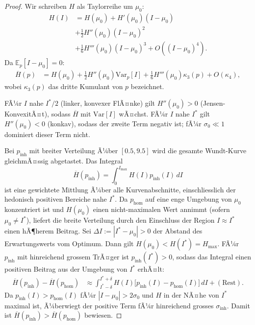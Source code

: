 ﻿\documentclass[12pt,a4paper]{article}
\theoremstyle{definition}
\newcommand{\E}{\mathbb{E}}
\newcommand{\Var}{\mathrm{Var}}
\newcommand{\MHI}{\overline{H}}
\begin{document}
\begin{proof}
Wir schreiben $H$ als Taylorreihe um $\mu_0$:
\begin{align*}
  H(I) &= H(\mu_0) + H'(\mu_0)(I - \mu_0) \\ &+ \tfrac{1}{2}H''(\mu_0)(I-\mu_0)^2 \\
          &+ \tfrac{1}{6}H'''(\mu_0)(I-\mu_0)^3 + O((I-\mu_0)^4).
\end{align*}
Da $\E_{p}[I - \mu_0] = 0$:
\begin{align}
  \MHI(p) &= H(\mu_0) + \tfrac{1}{2}H''(\mu_0)\Var_p[I]
             + \tfrac{1}{6}H'''(\mu_0)\kappa_3(p) + O(\kappa_4),
  \label{eq:mhi_taylor}
\end{align}
wobei $\kappa_3(p)$ das dritte Kumulant von $p$ bezeichnet.

FÃ¼r $I$ nahe $I^*/2$ (linker, konvexer FlÃ¤nke) gilt $H''(\mu_0) > 0$
(Jensen-KonvexitÃ¤t), sodass $\MHI$ mit $\Var[I]$ wÃ¤chst.
FÃ¼r $I$ nahe $I^*$ gilt $H''(\mu_0) < 0$ (konkav), sodass der zweite
Term negativ ist; fÃ¼r $\sigma_0 \ll 1$ dominiert dieser Term nicht.

Bei $p_{\mathrm{inh}}$ mit breiter Verteilung Ã¼ber $[0.5, 9.5]$ wird
die gesamte Wundt-Kurve gleichmÃ¤ssig abgetastet. Das Integral
\[
  \MHI(p_{\mathrm{inh}}) = \int_0^{I_{\max}} H(I) p_{\mathrm{inh}}(I)\, dI
\]
ist eine gewichtete Mittlung Ã¼ber alle Kurvenabschnitte, einschliesslich
der hedonisch positiven Bereiche nahe $I^*$. Da $p_{\mathrm{hom}}$
auf eine enge Umgebung von $\mu_0$ konzentriert ist und $H(\mu_0)$ einen
nicht-maximalen Wert annimmt (sofern $\mu_0 \neq I^*$), liefert die
breite Verteilung durch den Einschluss der Region $I \approx I^*$ einen
hÃ¶herem Beitrag. Sei $\Delta I := |I^* - \mu_0| > 0$ der Abstand des
Erwartungswerts vom Optimum. Dann gilt $H(\mu_0) < H(I^*) = H_{\max}$.
FÃ¼r $p_{\mathrm{inh}}$ mit hinreichend grossem TrÃ¤ger ist
$p_{\mathrm{inh}}(I^*) > 0$, sodass das Integral einen positiven Beitrag
aus der Umgebung von $I^*$ erhÃ¤lt:
\begin{align*}
  \MHI(p_{\mathrm{inh}}) - \MHI(p_{\mathrm{hom}})
  &\approx \int_{I^* - \delta}^{I^* + \delta}
      H(I)\bigl[p_{\mathrm{inh}}(I) - p_{\mathrm{hom}}(I)\bigr]\, dI
  + (\text{Rest}).
\end{align*}
Da $p_{\mathrm{inh}}(I) > p_{\mathrm{hom}}(I)$ fÃ¼r $|I - \mu_0| > 2\sigma_0$
und $H$ in der NÃ¤he von $I^*$ maximal ist, Ã¼berwiegt der positive Term
fÃ¼r hinreichend grosses $\sigma_{\mathrm{inh}}$. Damit ist
$\MHI(p_{\mathrm{inh}}) > \MHI(p_{\mathrm{hom}})$ bewiesen.
\end{proof}
\end{document}
